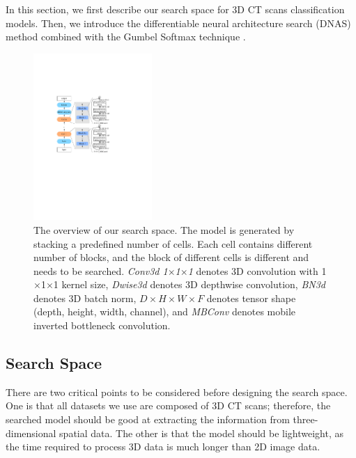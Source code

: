 \documentclass[letterpaper]{article}
\begin{document}


In this section, we first describe our search space for 3D CT scans classification models. Then, we introduce the differentiable neural architecture search (DNAS) method combined with the Gumbel Softmax technique \cite{Gumbel_Softmax,gdas}.


\begin{figure}[!ht]
    \centering
    \includegraphics[width=0.4\textwidth, height=0.45\textwidth]{images/mnasnet_new.pdf}
    \caption{The overview of our search space. The model is generated by stacking a predefined number of cells. Each cell contains different number of blocks, and the block of different cells is different and needs to be searched. \textit{Conv3d 1$\times$1$\times$1} denotes 3D convolution with 1$\times$1$\times$1 kernel size, \textit{Dwise3d} denotes 3D depthwise convolution, \textit{BN3d} denotes 3D batch norm, $D\times H\times W\times F$ denotes tensor shape (depth, height, width, channel), and \textit{MBConv} denotes mobile inverted bottleneck convolution.}
    \label{fig:search_space}
\end{figure}


\subsection{Search Space}

There are two critical points to be considered before designing the search space. One is that all datasets we use are composed of 3D CT scans; therefore, the searched model should be good at extracting the information from three-dimensional spatial data. The other is that the model should be lightweight, as the time required to process 3D data is much longer than 2D image data.
\end{document}
